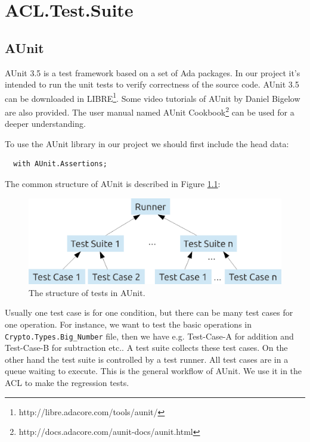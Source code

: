 \chapter{ACL.Test.Suite}
\section{AUnit}
AUnit 3.5 is a test framework based on a set of Ada packages. In our
project it's intended to run the unit tests to verify correctness of
the source code. AUnit 3.5 can be downloaded in
LIBRE\footnote{http://libre.adacore.com/tools/aunit/}. Some video
tutorials of AUnit by Daniel Bigelow are also provided. The user
manual named AUnit
Cookbook\footnote{http://docs.adacore.com/aunit-docs/aunit.html} can
be used for a deeper understanding.

To use the AUnit library in our project we should first include the head data:
\begin{lstlisting}
  with AUnit.Assertions;
\end{lstlisting}

The common structure of AUnit is described in Figure \ref{TestAunit}:
\begin{figure}[htp]
  \centering
  \includegraphics[scale=0.7]{./images/Structure_Test}
  \caption{The structure of tests in AUnit.}\label{TestAunit}
\end{figure}

Usually one test case is for one condition, but there can be many test
cases for one operation. For instance, we want to test the basic
operations in \texttt{Crypto.Types.Big\_Number} file, then we have
e.g. Test-Case-A for addition and Test-Case-B for subtraction etc.. A
test suite collects these test cases. On the other hand the test suite
is controlled by a test runner. All test cases are in a queue waiting
to execute. This is the general workflow of AUnit. We use it in the
ACL to make the regression tests.


